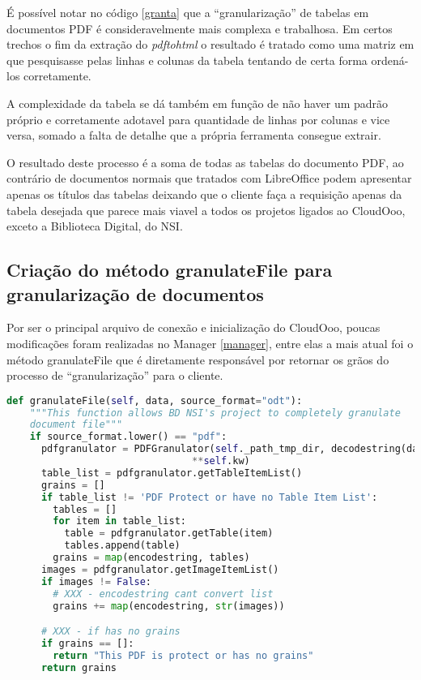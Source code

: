 É possível notar no código \ref{granta} que a ``granularização'' de tabelas em documentos PDF é consideravelmente mais complexa e trabalhosa. Em certos trechos o fim da extração do \textit{pdftohtml} o resultado é tratado como uma matriz em que pesquisasse pelas linhas e colunas da tabela tentando de certa forma ordená-los corretamente. 

A complexidade da tabela se dá também em função de não haver um padrão próprio e corretamente adotavel para quantidade de linhas por colunas e vice versa, somado a falta de detalhe que a própria ferramenta consegue extrair.

O resultado deste processo é a soma de todas as tabelas do documento PDF, ao contrário de documentos normais que tratados com LibreOffice podem apresentar apenas os títulos das tabelas deixando que o cliente faça a requisição apenas da tabela desejada que parece mais viavel a todos os projetos ligados ao CloudOoo, exceto a Biblioteca Digital, do NSI.


\subsection{Criação do método granulateFile para granularização de documentos}

Por ser o principal arquivo de conexão e inicialização do CloudOoo, poucas modificações foram realizadas no Manager \ref{manager}, entre elas a mais atual foi o método granulateFile que é diretamente responsável por retornar os grãos do processo de ``granularização'' para o cliente.

{\singlespace
\begin{lstlisting}[caption=método granulateFile do Manager,language=python,label={granfile}]
  def granulateFile(self, data, source_format="odt"):
    """This function allows BD NSI's project to completely granulate 
    document file"""
    if source_format.lower() == "pdf":
      pdfgranulator = PDFGranulator(self._path_tmp_dir, decodestring(data), 'pdf',
                                **self.kw)
      table_list = pdfgranulator.getTableItemList()
      grains = []
      if table_list != 'PDF Protect or have no Table Item List':
        tables = []
        for item in table_list:
          table = pdfgranulator.getTable(item)
          tables.append(table)
        grains = map(encodestring, tables)
      images = pdfgranulator.getImageItemList()
      if images != False:
        # XXX - encodestring cant convert list
        grains += map(encodestring, str(images))

      # XXX - if has no grains
      if grains == []:
        return "This PDF is protect or has no grains"
      return grains
\end{lstlisting}
}

